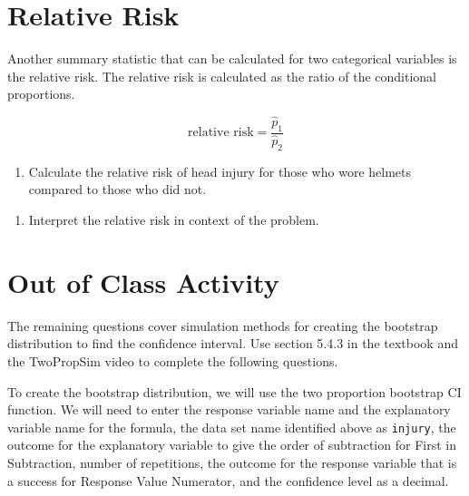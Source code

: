 \documentclass[
]{report}
\providecommand{\tightlist}{%
  \setlength{\itemsep}{0pt}\setlength{\parskip}{0pt}}
\begin{document}
\vspace{1in}

\newpage

\hypertarget{relative-risk}{%
\section{Relative Risk}\label{relative-risk}}

Another summary statistic that can be calculated for two categorical variables is the relative risk. The relative risk is calculated as the ratio of the conditional proportions.

\[\text{relative risk} = \frac{\hat{p}_1}{\hat{p}_2}\]

\begin{enumerate}
\def\labelenumi{\arabic{enumi}.}
\setcounter{enumi}{13}
\tightlist
\item
  Calculate the relative risk of head injury for those who wore helmets compared to those who did not.
\end{enumerate}

\vspace{1in}

\begin{enumerate}
\def\labelenumi{\arabic{enumi}.}
\setcounter{enumi}{14}
\tightlist
\item
  Interpret the relative risk in context of the problem.
\end{enumerate}

\vspace{1in}

\hypertarget{out-of-class-activity}{%
\section{Out of Class Activity}\label{out-of-class-activity}}

The remaining questions cover simulation methods for creating the bootstrap distribution to find the confidence interval. Use section 5.4.3 in the textbook and the TwoPropSim video to complete the following questions.

To create the bootstrap distribution, we will use the two proportion bootstrap CI function. We will need to enter the response variable name and the explanatory variable name for the formula, the data set name identified above as \texttt{injury}, the outcome for the explanatory variable to give the order of subtraction for First in Subtraction, number of repetitions, the outcome for the response variable that is a success for Response Value Numerator, and the confidence level as a decimal.
\end{document}
